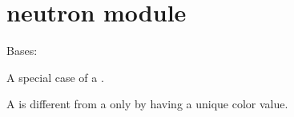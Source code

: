 \documentclass[letterpaper,10pt,english]{sphinxmanual}
\begin{document}
\section{neutron module}
\label{\detokenize{neutron:module-neutron}}\label{\detokenize{neutron:neutron-module}}\label{\detokenize{neutron::doc}}

\begin{fulllineitems}
\label{\detokenize{neutron:neutron.Neutron}}
Bases: {\hyperref[\detokenize{neutron:neutron.Soldier}]{}}

A special case of a {\hyperref[\detokenize{neutron:neutron.Soldier}]{}}.

A  is different from a  only by having a unique color
value.

\begin{fulllineitems}
\label{\detokenize{neutron:neutron.Neutron.VALUE}}
\end{fulllineitems}


\end{fulllineitems}

\end{document}
